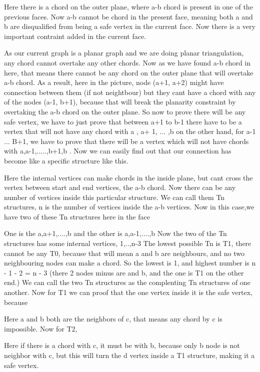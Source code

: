 \documentclass[12pt,a4paper]{article}
\begin{document}
Here there is a chord on the outer plane, where a-b chord is present in one of the previous faces. Now a-b cannot be chord in the present face, meaning both a and b are disqualified from being a safe vertex in the current face. Now there is a very important contraint added in the current face.

As our current graph is a planar graph and we are doing planar triangulation, any chord cannot overtake any other chords. Now as we have found a-b chord in here, that means there cannot be any chord on the outer plane that will overtake a-b chord. As a result, here in the picture, node (a+1, a+2) might have connection between them (if not neightbour) but they cant have a chord with any of the nodes (a-1, b+1), because that will break the planarity constraint by overtaking the a-b chord on the outer plane. So now to prove there will be any safe vertex, we have to just prove that between a+1 to b-1 there have to be a vertex that will not have any chord with a , a+ 1, ... ,b on the other hand, for a-1 ... B+1, we have to prove that there will be a vertex which will not have chords with a,a-1,.....,b+1,b .
Now we can easily find out that our connection has become like a specific structure like this.

Here the internal vertices can make chords in the inside plane, but cant cross the vertex between start and end vertices, the a-b chord. Now there can be any number of vertices inside this particular structure. We can call them Tn structures, n is the number of vertices inside the a-b vertices. 
Now in this case,we have two of these Tn structures here in the face

One is the a,a+1,....,b and the other is a,a-1,....,b 
Now the two of the Tn structures has some internal vertices, 1,..,n-3
The lowest possible Tn is T1, there cannot be any T0, because that will mean a and b are neighbours, and no two neighbouring nodes can make a chord.
So the lowest is 1, and highest number is n - 1 - 2 = n - 3 (there 2 nodes minus are and b, and the one is T1 on the other end.)
We can call the two Tn structures as the complenting Tn structures of one another. 
Now for T1 we can proof that the one vertex inside it is the safe vertex, because

Here a and b both are the neighbors of c, that means any chord by c is impossible.
Now for T2, 

Here if there is a chord with c, it must be with b, because only b node is not neighbor with c, but this will turn the d vertex inside a T1 structure, making it a safe vertex.
\end{document}
